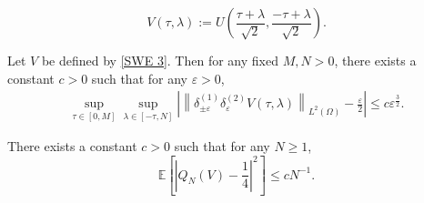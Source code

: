 \documentclass[10pt,a4paper]{amsart}
\begin{document}
\begin{equation}\label{SWE 3}
V(\tau, \lambda) := U\left(\frac{\tau+\lambda}{\sqrt{2}}, \frac{-\tau+\lambda}{\sqrt{2}}\right). 
\end{equation}

   \begin{corollary}\label{coro V}    Let $V$ be defined  by \eqref{SWE 3}.     Then  for any fixed $M, N>0$,  there exists a constant $c>0$ such that  for any   $\varepsilon>0$, 
  \begin{equation}\label{eq V est}
        \begin{split}
         \sup_{\tau\in [0,M]}\sup_{\lambda\in [-\tau, N]}  \left|  \left\|    \delta_{\pm\varepsilon}^{(1)}\delta_{\varepsilon}^{(2)}V(\tau, \lambda) \right\|_{L^2(\Omega)}-\frac{\varepsilon}{2}\right| \le c  \varepsilon^{\frac{3}{2}}. 
    \end{split}
    \end{equation}      
    \end{corollary}

  	 	    	\begin{lemma}\label{lem linear app}   There exists a constant $c>0$ such that for any $N\ge 1$, 
		\begin{equation}\label{2f-10}
			\mathbb{E}\left[ \left| Q_{N}(V) -\frac14\right|^2   \right]  \le c N^{-1}.
					\end{equation} 
	\end{lemma}
\end{document}
